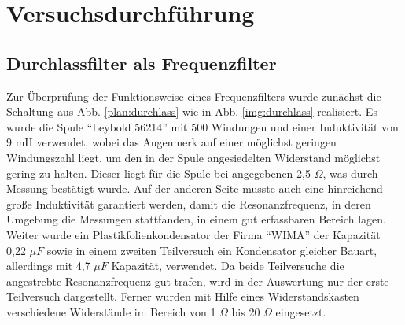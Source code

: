 \section{Versuchsdurchführung}
\subsection{Durchlassfilter als Frequenzfilter}
Zur Überprüfung der Funktionsweise eines Frequenzfilters wurde zunächst die Schaltung aus
Abb. \ref{plan:durchlass} wie in Abb. \ref{img:durchlass} realisiert. Es wurde die Spule \enquote{Leybold 56214} mit 500 Windungen und einer Induktivität von 9 mH verwendet, wobei das Augenmerk auf einer möglichst geringen Windungszahl liegt, um den in der Spule angesiedelten Widerstand möglichst gering zu halten. Dieser liegt für die Spule bei angegebenen 2,5 $ \Omega $, was durch Messung bestätigt wurde. Auf
der anderen Seite musste auch eine hinreichend große Induktivität garantiert werden, damit die Resonanzfrequenz, in deren Umgebung die Messungen stattfanden, in einem gut erfassbaren Bereich lagen. Weiter wurde ein Plastikfolienkondensator der Firma \enquote{WIMA} der Kapazität 0,22 $  \mu F $ sowie in einem zweiten Teilversuch ein Kondensator gleicher Bauart, allerdings mit 4,7 $  \mu F $ Kapazität, verwendet. Da beide Teilversuche die angestrebte Resonanzfrequenz gut trafen, wird in der Auswertung nur der erste Teilversuch dargestellt. Ferner wurden
mit Hilfe eines Widerstandskasten verschiedene Widerstände im Bereich von 1 $ \Omega $ bis 20 $ \Omega $ eingesetzt.

